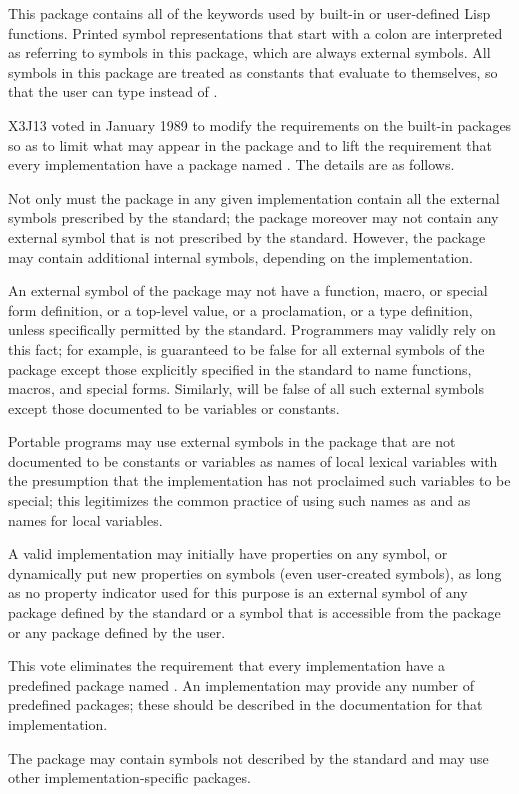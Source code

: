 \begin{flushdesc}
\item[\cd{keyword}]
This package contains all of the keywords used by built-in
or user-defined Lisp functions.  Printed symbol representations
that start with a colon are interpreted as referring to symbols
in this package, which are always external symbols.  All symbols in this
package are treated as constants that evaluate to themselves, so that the
user can type  instead of .
\end{flushdesc}

\begin{new}
X3J13 voted in January 1989
to modify the requirements on the built-in packages
so as to limit what may appear in the  package
and to lift the requirement that every implementation have a package
named .  The details are as follows.

Not only must the  package in any given implementation
contain all the external symbols prescribed by the standard;
the  package moreover may not contain any external symbol
that is not prescribed by the standard.  However, the 
package may contain additional internal symbols, depending on the
implementation.

An external symbol of the  package may not have a function,
macro, or special form definition, or a top-level value,
or a  proclamation, or a type definition, unless specifically
permitted by the standard.  Programmers may validly rely on this fact;
for example,  is guaranteed to be false for all
external symbols of the  package except those explicitly
specified in the standard to name functions, macros, and special forms.
Similarly,  will be false of all such external symbols
except those documented to be variables or constants.

Portable programs
may use external symbols in the  package that are not documented
to be constants or variables as names of local lexical
variables with the presumption that the implementation has not
proclaimed such variables to be special; this legitimizes the common
practice of using such names as  and  as names
for local variables.

A valid implementation may initially have properties on any symbol,
or dynamically put new properties on symbols (even user-created symbols),
as long as no property indicator used for this purpose is
an external symbol of any package defined by the standard
or a symbol that is accessible from the  package or any
package defined by the user.

This vote eliminates the requirement that every implementation have
a predefined package named .  An implementation may
provide any number of predefined packages; these should be described
in the documentation for that implementation.

The  package may contain symbols not described by the standard
and may use other implementation-specific packages.
\end{new}

